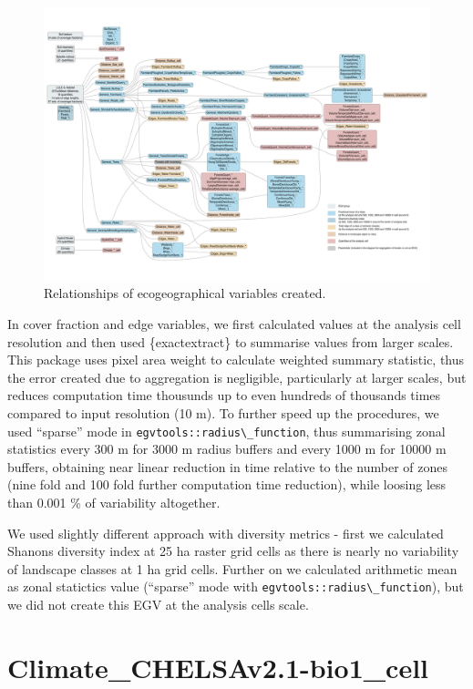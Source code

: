 \documentclass[
]{book}
\newcommand{\passthrough}[1]{#1}
\begin{document}
\begin{figure}
\includegraphics[width=1\linewidth]{./Figures/EGV_FlowChartY_eps_krasains_300dpi_2} \caption{Relationships of ecogeographical variables created.}\label{fig:flowchart}
\end{figure}

In cover fraction and edge variables, we first calculated values at the analysis
cell resolution and then used \{exactextract\} to summarise values from larger scales.
This package uses pixel area weight to calculate weighted summary statistic, thus the
error created due to aggregation is negligible, particularly at larger scales, but
reduces computation time thousunds up to even hundreds of thousands times compared
to input resolution (10 m). To further speed up the procedures, we used ``sparse''
mode in \passthrough{\lstinline!egvtools::radius\_function!}, thus summarising zonal statistics every 300 m for
3000 m radius buffers and every 1000 m for 10000 m buffers, obtaining near linear
reduction in time relative to the number of zones (nine fold and 100 fold further
computation time reduction), while loosing less than 0.001 \% of variability altogether.

We used slightly different approach with diversity metrics - first we calculated
Shanons diversity index at 25 ha raster grid cells as there is nearly no variability
of landscape classes at 1 ha grid cells. Further on we calculated arithmetic mean as
zonal statictics value (``sparse'' mode with \passthrough{\lstinline!egvtools::radius\_function!}), but we
did not create this EGV at the analysis cells scale.

\section{Climate\_CHELSAv2.1-bio1\_cell}\label{ch06.001}
\end{document}
